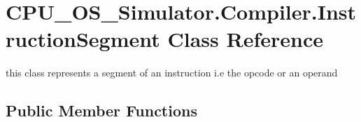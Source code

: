 \hypertarget{class_c_p_u___o_s___simulator_1_1_compiler_1_1_instruction_segment}{}\section{C\+P\+U\+\_\+\+O\+S\+\_\+\+Simulator.\+Compiler.\+Instruction\+Segment Class Reference}
\label{class_c_p_u___o_s___simulator_1_1_compiler_1_1_instruction_segment}


this class represents a segment of an instruction i.\+e the opcode or an operand  


\subsection*{Public Member Functions}
